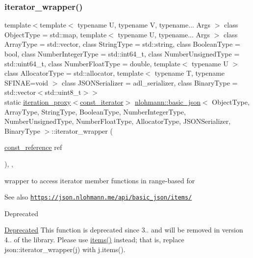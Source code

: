 \subsubsection{\texorpdfstring{iterator\+\_\+wrapper()}{iterator\_wrapper()}\hspace{0.1cm}{\footnotesize\ttfamily [2/2]}}
{\footnotesize\ttfamily template$<$template$<$ typename U, typename V, typename... Args $>$ class Object\+Type = std\+::map, template$<$ typename U, typename... Args $>$ class Array\+Type = std\+::vector, class String\+Type  = std\+::string, class Boolean\+Type  = bool, class Number\+Integer\+Type  = std\+::int64\+\_\+t, class Number\+Unsigned\+Type  = std\+::uint64\+\_\+t, class Number\+Float\+Type  = double, template$<$ typename U $>$ class Allocator\+Type = std\+::allocator, template$<$ typename T, typename S\+F\+I\+N\+A\+E=void $>$ class J\+S\+O\+N\+Serializer = adl\+\_\+serializer, class Binary\+Type  = std\+::vector$<$std\+::uint8\+\_\+t$>$$>$ \\
static \hyperlink{classnlohmann_1_1detail_1_1iteration__proxy}{iteration\+\_\+proxy}$<$\hyperlink{classnlohmann_1_1basic__json_aebd2cfa7e4ded4e97cde9269bfeeea38}{const\+\_\+iterator}$>$ \hyperlink{classnlohmann_1_1basic__json}{nlohmann\+::basic\+\_\+json}$<$ Object\+Type, Array\+Type, String\+Type, Boolean\+Type, Number\+Integer\+Type, Number\+Unsigned\+Type, Number\+Float\+Type, Allocator\+Type, J\+S\+O\+N\+Serializer, Binary\+Type $>$\+::iterator\+\_\+wrapper (\begin{DoxyParamCaption}\item[{\hyperlink{classnlohmann_1_1basic__json_ab8a1c33ee7b154fc41ca2545aa9724e6}{const\+\_\+reference}}]{ref }\end{DoxyParamCaption})\hspace{0.3cm}{\ttfamily [inline]}, {\ttfamily [static]}, {\ttfamily [noexcept]}}



wrapper to access iterator member functions in range-\/based for 

\begin{DoxySeeAlso}{See also}
\href{https://json.nlohmann.me/api/basic_json/items/}{\tt https\+://json.\+nlohmann.\+me/api/basic\+\_\+json/items/} 
\end{DoxySeeAlso}
\begin{DoxyRefDesc}{Deprecated}
\item[\hyperlink{deprecated__deprecated000002}{Deprecated}]This function is deprecated since 3.. and will be removed in version 4.. of the library. Please use \hyperlink{classnlohmann_1_1basic__json_a916a6ba75ec7624e9c6c977a52d6fd17}{items()} instead; that is, replace {\ttfamily json\+::iterator\+\_\+wrapper(j)} with {\ttfamily j.\+items()}. \end{DoxyRefDesc}
\mbox{\label{classnlohmann_1_1basic__json_a1b46c6631e30b8394e89bd1546d69736}} 
